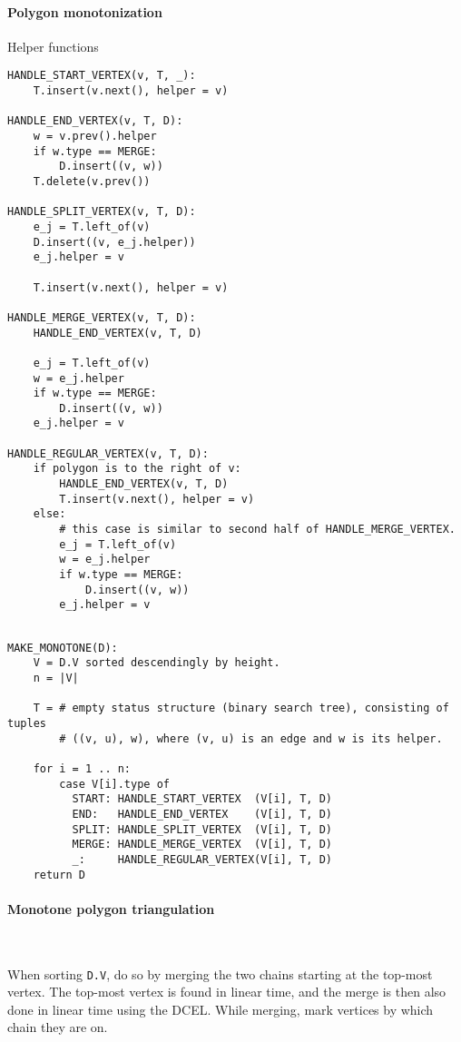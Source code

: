 \paragraph{Polygon monotonization}

Helper functions
\begin{verbatim}
HANDLE_START_VERTEX(v, T, _):
    T.insert(v.next(), helper = v)

HANDLE_END_VERTEX(v, T, D):
    w = v.prev().helper
    if w.type == MERGE:
        D.insert((v, w))
    T.delete(v.prev())

HANDLE_SPLIT_VERTEX(v, T, D):
    e_j = T.left_of(v)
    D.insert((v, e_j.helper))
    e_j.helper = v

    T.insert(v.next(), helper = v)

HANDLE_MERGE_VERTEX(v, T, D):
    HANDLE_END_VERTEX(v, T, D)

    e_j = T.left_of(v)
    w = e_j.helper
    if w.type == MERGE:
        D.insert((v, w))
    e_j.helper = v

HANDLE_REGULAR_VERTEX(v, T, D):
    if polygon is to the right of v:
        HANDLE_END_VERTEX(v, T, D)
        T.insert(v.next(), helper = v)
    else:
        # this case is similar to second half of HANDLE_MERGE_VERTEX.
        e_j = T.left_of(v)
        w = e_j.helper
        if w.type == MERGE:
            D.insert((v, w))
        e_j.helper = v
    
\end{verbatim}
\begin{verbatim}
MAKE_MONOTONE(D):
    V = D.V sorted descendingly by height.
    n = |V|

    T = # empty status structure (binary search tree), consisting of tuples
        # ((v, u), w), where (v, u) is an edge and w is its helper.

    for i = 1 .. n:
        case V[i].type of
          START: HANDLE_START_VERTEX  (V[i], T, D)
          END:   HANDLE_END_VERTEX    (V[i], T, D)
          SPLIT: HANDLE_SPLIT_VERTEX  (V[i], T, D)
          MERGE: HANDLE_MERGE_VERTEX  (V[i], T, D)
          _:     HANDLE_REGULAR_VERTEX(V[i], T, D)
    return D
\end{verbatim}

\paragraph{Monotone polygon triangulation}~\smallskip

When sorting \texttt{D.V}, do so by merging the two chains starting at the
top-most vertex. The top-most vertex is found in linear time, and the merge is
then also done in linear time using the DCEL. While merging, mark vertices by
which chain they are on.


